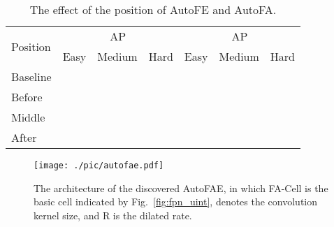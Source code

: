 \documentclass[sigconf]{acmart}
\begin{document}
\begin{table}[!t]
    \centering
    \begin{tabular}{l|ccc|ccc}
        \toprule[1pt]
        \multirow{2}{*}{Position} & \multicolumn{3}{c|}{AP} & \multicolumn{3}{c}{AP} \\
        \cline{2-7}
        & Easy & Medium & Hard & Easy & Medium & Hard \\
        \midrule[0.5pt]
        Baseline &  &  &  &  &  &  \\
        Before &  &  &  &  &  &  \\
        Middle &  &  &  &  &  &  \\
        After &  &  &  &  &  &  \\
        \bottomrule[1pt]
    \end{tabular}
    \caption{The effect of the position of AutoFE and AutoFA.}
    \label{tab:different_position}
\end{table}



\begin{figure}[!t]
    \centering
    \texttt{[image: ./pic/autofae.pdf]}
    \vspace{-2.5mm}
    \caption{The architecture of the discovered AutoFAE, in which FA-Cell is the basic cell indicated by Fig.~\ref{fig:fpn_uint},  denotes the convolution kernel size, and R is the dilated rate.}
    \vspace{-3.5mm}
    \label{fig:autofae}
\end{figure}

\begin{table}[!t]
    \centering
    \caption{The family of ASFD, where latency (ms) is measured with VGA-resolution images and on Nvidia V100 GPU.}
    \label{tab:trade_off}
\end{table}
\end{document}
